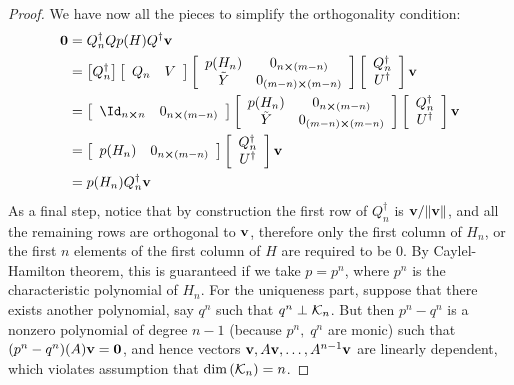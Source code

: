 \begin{proof}
We have now all the pieces to simplify the orthogonality condition:
\begin{align*}
	\vectorbold{0} &= Q_n^{\dagger} Q p(H) Q^{\dagger}\vectorbold{v}\\
	&= \left[Q_n^{\dagger}\right] 
	\left[\begin{array}{cc}
		Q_n & V
	\end{array}\right]
	\left[\begin{array}{cc}
		p(H_n) & 0_{n\cross(m-n)}\\
		\tilde{Y} & 0_{(m-n)\cross(m-n)}
	\end{array}\right]
	\left[\begin{array}{cc}
		Q_n^{\dagger}\\
		U^{\dagger}
	\end{array}\right] \vectorbold{v}\\
	&= \left[\begin{array}{cc}
		\Id_{n\cross n} & 0_{n\cross(m-n)}
	\end{array}\right] 
	\left[\begin{array}{cc}
		p(H_n) & 0_{n\cross(m-n)}\\
		\tilde{Y} & 0_{(m-n)\cross(m-n)}
	\end{array}\right]
	\left[\begin{array}{cc}
		Q_n^{\dagger}\\
		U^{\dagger}
	\end{array}\right] \vectorbold{v}\\
	&= \left[\begin{array}{cc}
		p(H_n) & 0_{n\cross (m-n)} 
	\end{array}\right]
	\left[\begin{array}{cc}
		Q_n^{\dagger}\\
		U^{\dagger}
	\end{array}\right] \vectorbold{v}\\
	&= p(H_n)Q_n^{\dagger} \vectorbold{v}
\end{align*}
As a final step, notice that by construction the first row of \(Q_n^{\dagger}\) is
\(\vectorbold{v}/\norm{\vectorbold{v}}\), and all the remaining rows are orthogonal to \(\vectorbold{v}\),
therefore only the first column of \(H_n\), or the first \(n\) elements of the first column of \(H\) are required
to be \(0\). By Caylel-Hamilton theorem, this is guaranteed if we take \(p = p^n\), where \(p^n\) is the characteristic
polynomial of \(H_n\). For the uniqueness part, suppose that there exists another polynomial, say \(q^n\) such
that \(q^n \perp \mathcal{K}_{n}\). But then \(p^n - q^n\) is a nonzero polynomial of degree \(n-1\) (because \(p^n,\;q^n\) are
monic) such that \((p^n-q^n)(A)\vectorbold{v}=\vectorbold{0}\), and hence vectors \(\vectorbold{v},A\vectorbold{v},\ldots, A^{n-1}
\vectorbold{v}\) are linearly dependent, which violates assumption that \(\textrm{dim}\left(\mathcal{K}_{n}\right) = n\).
\end{proof}
